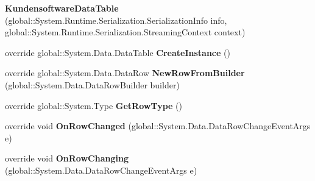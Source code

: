 \begin{DoxyCompactItemize}
\item 
{\bfseries Kundensoftware\+Data\+Table} (global\+::\+System.\+Runtime.\+Serialization.\+Serialization\+Info info, global\+::\+System.\+Runtime.\+Serialization.\+Streaming\+Context context)\hypertarget{class_products_1_1_data_1_1ds_sage_1_1_kundensoftware_data_table_a4fafe38bdff04bd6137a67a019f0ee8d}{}\label{class_products_1_1_data_1_1ds_sage_1_1_kundensoftware_data_table_a4fafe38bdff04bd6137a67a019f0ee8d}

\item 
override global\+::\+System.\+Data.\+Data\+Table {\bfseries Create\+Instance} ()\hypertarget{class_products_1_1_data_1_1ds_sage_1_1_kundensoftware_data_table_aeddeaadb437cd77b314ccc601a803b9b}{}\label{class_products_1_1_data_1_1ds_sage_1_1_kundensoftware_data_table_aeddeaadb437cd77b314ccc601a803b9b}

\item 
override global\+::\+System.\+Data.\+Data\+Row {\bfseries New\+Row\+From\+Builder} (global\+::\+System.\+Data.\+Data\+Row\+Builder builder)\hypertarget{class_products_1_1_data_1_1ds_sage_1_1_kundensoftware_data_table_a687e033df22dac878c6604037ccc0a5d}{}\label{class_products_1_1_data_1_1ds_sage_1_1_kundensoftware_data_table_a687e033df22dac878c6604037ccc0a5d}

\item 
override global\+::\+System.\+Type {\bfseries Get\+Row\+Type} ()\hypertarget{class_products_1_1_data_1_1ds_sage_1_1_kundensoftware_data_table_a9868b666d080cff1ec349efab6959073}{}\label{class_products_1_1_data_1_1ds_sage_1_1_kundensoftware_data_table_a9868b666d080cff1ec349efab6959073}

\item 
override void {\bfseries On\+Row\+Changed} (global\+::\+System.\+Data.\+Data\+Row\+Change\+Event\+Args e)\hypertarget{class_products_1_1_data_1_1ds_sage_1_1_kundensoftware_data_table_a9901a49073c7a760ab05d2eaf17835d2}{}\label{class_products_1_1_data_1_1ds_sage_1_1_kundensoftware_data_table_a9901a49073c7a760ab05d2eaf17835d2}

\item 
override void {\bfseries On\+Row\+Changing} (global\+::\+System.\+Data.\+Data\+Row\+Change\+Event\+Args e)\hypertarget{class_products_1_1_data_1_1ds_sage_1_1_kundensoftware_data_table_a9de2dc450fa0c0eef7413dffe1fead52}{}\label{class_products_1_1_data_1_1ds_sage_1_1_kundensoftware_data_table_a9de2dc450fa0c0eef7413dffe1fead52}


\end{DoxyCompactItemize}
